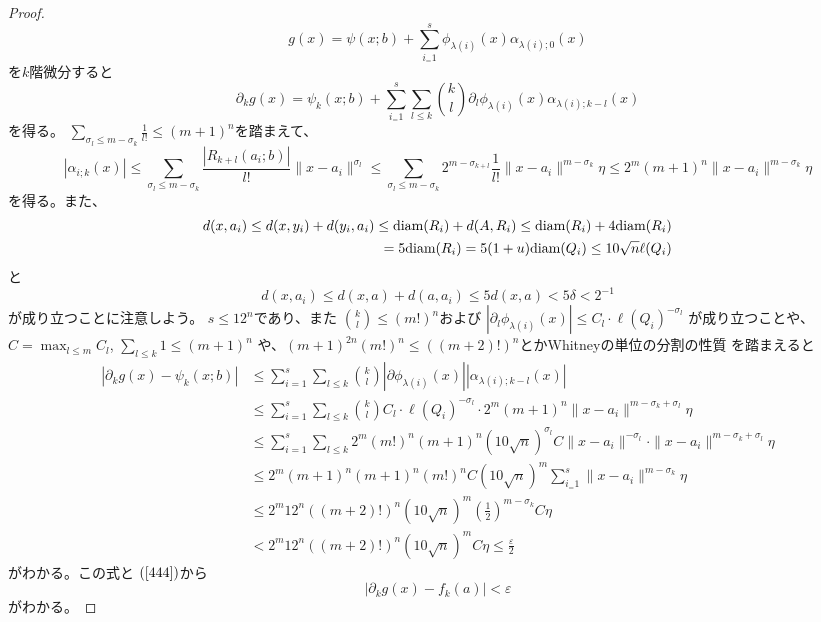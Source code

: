 \documentclass[leqno]{jsarticle}
\newcommand{\ep}{\varepsilon}
\newcommand{\di}{\text{{\rm diam}}}
\begin{document}
\begin{proof}
\[
g(x)=\psi(x;b)+\sum_{i_=1}^s\phi_{\lambda(i)}(x)\alpha_{\lambda(i);0}(x)
\]
を$k$階微分すると
\[
\partial_kg(x)=\psi_k(x;b)+\sum_{i_=1}^s\sum_{l\le k}\binom{k}{l}\partial_l\phi_{\lambda(i)}(x)\alpha_{\lambda(i);k-l}(x)
\]
を得る。
$\sum_{\sigma_l\le m-\sigma_k}\frac{1}{l!}\le (m+1)^n$を踏まえて、
\[
|\alpha_{i;k}(x)|\le \sum_{\sigma_l\le 
m-\sigma_k}\frac{|R_{k+l}(a_i;b)|}{l!}\|x-a_i\|^{\sigma_l}
\le  \sum_{\sigma_l\le m-\sigma_k}2^{m-\sigma_{k+l}}\frac{1}{l!}\|x-a_i\|^{m-\sigma_k}\eta\le 2^m(m+1)^n\|x-a_i\|^{m-\sigma_k}\eta
\]
を得る。また、
\begin{align*}
d(x,a_i)\le d(x,y_i)+d(y_i,a_i)\le \di(R_i)+d(A,R_i)\le \di(R_i)+4\di(R_i)\\
=5\di(R_i)=5(1+u)\di(Q_i)\le 10\sqrt{n}\ell(Q_i)
\end{align*}
と
\[
d(x,a_i)\le d(x,a)+d(a,a_i)\le 5d(x,a)<5\delta<2^{-1}
\]
が成り立つことに注意しよう。
$s\le 12^n$であり、また
$\binom{k}{l}\le (m!)^n$および
$|\partial_l\phi_{\lambda(i)}(x)|\le C_l\cdot\ell(Q_i)^{-\sigma_l}$
が成り立つことや、
$C=\max_{l\le m}C_l$, 
$\sum_{l\le k}1\le (m+1)^n$
や、$(m+1)^{2n}(m!)^n\le ((m+2)!)^n$とかWhitneyの単位の分割の性質
を踏まえると
\begin{align*}
|\partial_kg(x)-\psi_k(x;b)|
&\le\sum_{i=1}^s\sum_{l\le k}\binom{k}{l}|\partial\phi_{\lambda(i)}(x)||\alpha_{\lambda(i);k-l}(x)|\\
&\le\sum_{i=1}^s\sum_{l\le k}\binom{k}{l}C_l\cdot\ell(Q_i)^{-\sigma_l}\cdot 2^m(m+1)^n\|x-a_i\|^{m-\sigma_k+\sigma_l}\eta\\
&\le \sum_{i=1}^s\sum_{l\le k}2^m(m!)^n(m+1)^n(10\sqrt{n})^{\sigma_l}C\|x-a_i\|^{-\sigma_l}\cdot \|x-a_i\|^{m-\sigma_k+\sigma_l}\eta\\
&\le 2^m(m+1)^n(m+1)^n(m!)^nC(10\sqrt{n})^{m}\sum_{i_=1}^s\|x-a_i\|^{m-\sigma_k}\eta\\
&\le 2^m12^n ((m+2)!)^n(10\sqrt{n})^m \left(\frac{1}{2}\right)^{m-\sigma_k}C\eta\\
& < 2^m12^n ((m+2)!)^n(10\sqrt{n})^mC \eta \le \frac{\ep}{2}
\end{align*}
がわかる。この式と
$(\ref{444})$から
\[
|\partial_kg(x)-f_k(a)|<\ep
\]
がわかる。

\end{proof}
\end{document}
